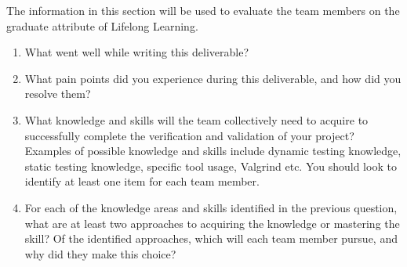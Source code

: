 \documentclass[12pt, titlepage]{article}
\begin{document}

The information in this section will be used to evaluate the team members on the
graduate attribute of Lifelong Learning.



\begin{enumerate}
  \item What went well while writing this deliverable? 
  \item What pain points did you experience during this deliverable, and how
    did you resolve them?
  \item What knowledge and skills will the team collectively need to acquire to
  successfully complete the verification and validation of your project?
  Examples of possible knowledge and skills include dynamic testing knowledge,
  static testing knowledge, specific tool usage, Valgrind etc.  You should look to
  identify at least one item for each team member.
  \item For each of the knowledge areas and skills identified in the previous
  question, what are at least two approaches to acquiring the knowledge or
  mastering the skill?  Of the identified approaches, which will each team
  member pursue, and why did they make this choice?
\end{enumerate}
\end{document}
